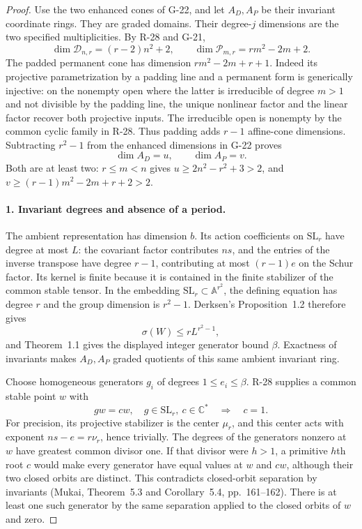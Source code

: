 \begin{proof}
Use the two enhanced cones of G-22, and let $A_D,A_P$ be
their invariant coordinate rings. They are graded domains.
Their degree-$j$ dimensions are the two specified multiplicities.
By R-28 and G-21,
\[
 \dim\mathcal D_{n,r}=(r-2)n^2+2,\qquad
 \dim\mathcal P_{m,r}=rm^2-2m+2.
\]
The padded permanent cone has dimension
$rm^2-2m+r+1$. Indeed its projective parametrization by a
padding line and a permanent form is generically injective:
on the nonempty open where the latter is irreducible of degree
$m>1$ and not divisible by the padding line, the unique
nonlinear factor and the linear factor recover both projective
inputs. The irreducible open is nonempty by the common cyclic
family in R-28. Thus padding adds $r-1$ affine-cone dimensions.
Subtracting $r^2-1$ from the enhanced dimensions in G-22 proves
\[
 \dim A_D=u,\qquad\dim A_P=v.
\]
Both are at least two: $r\le m<n$ gives
$u\ge2n^2-r^2+3>2$, and
$v\ge(r-1)m^2-2m+r+2>2$.

\paragraph{1. Invariant degrees and absence of a period.}
The ambient representation has dimension $b$. Its action
coefficients on $\mathrm{SL}_r$ have degree at most $L$:
the covariant factor contributes $ns$, and the entries of
the inverse transpose have degree $r-1$, contributing at
most $(r-1)e$ on the Schur factor. Its kernel is finite
because it is contained in the finite stabilizer of the
common stable tensor. In the embedding
$\mathrm{SL}_r\subset\mathbb A^{r^2}$, the defining equation
has degree $r$ and the group dimension is $r^2-1$.
Derksen's Proposition~1.2 therefore gives
\[
 \sigma(W)\le rL^{r^2-1},
\]
and Theorem~1.1 gives the displayed integer generator bound
$\beta$. Exactness of invariants makes $A_D,A_P$ graded
quotients of this same ambient invariant ring.

Choose homogeneous generators $g_i$ of degrees
$1\le e_i\le\beta$. R-28 supplies a common stable point
$w$ with
\[
 gw=cw,\quad g\in\mathrm{SL}_r,\ c\in\mathbb C^*
                  \quad\Longrightarrow\quad c=1.
\]
For precision, its projective stabilizer is the center
$\mu_r$, and this center acts with exponent
$ns-e=r\nu_r$, hence trivially.
The degrees of the generators nonzero at $w$ have greatest
common divisor one. If that divisor were $h>1$, a primitive
$h$th root $c$ would make every generator have equal values
at $w$ and $cw$, although their two closed orbits are distinct.
This contradicts closed-orbit separation by invariants
(Mukai, Theorem~5.3 and Corollary~5.4, pp.~161--162).
There is at least one such generator by the same separation
applied to the closed orbits of $w$ and zero.


\end{proof}
